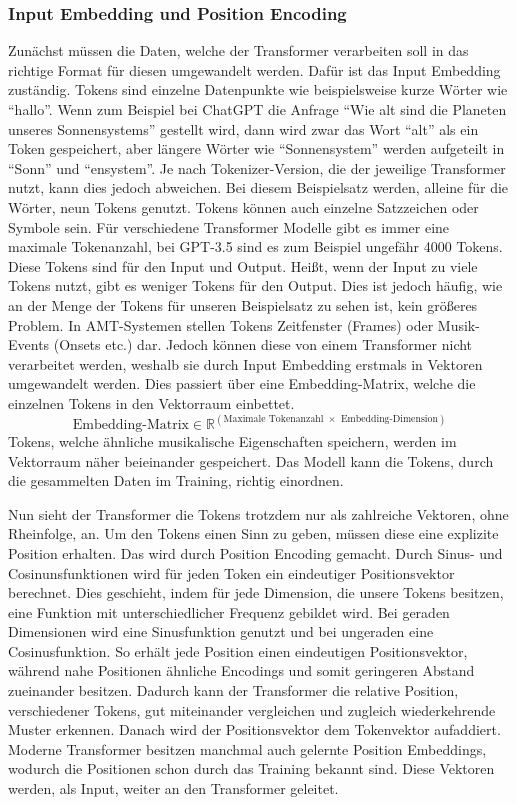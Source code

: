 \subsubsection{Input Embedding und Position Encoding}
Zunächst müssen die Daten, welche der Transformer verarbeiten soll in das richtige Format für diesen umgewandelt werden.
Dafür ist das Input Embedding zuständig.
Tokens sind einzelne Datenpunkte wie beispielsweise kurze Wörter wie \enquote{hallo}.
Wenn zum Beispiel bei ChatGPT die Anfrage \enquote{Wie alt sind die Planeten unseres Sonnensystems} gestellt wird,
dann wird zwar das Wort \enquote{alt} als ein Token gespeichert, aber längere Wörter wie \enquote{Sonnensystem}
werden aufgeteilt in \enquote{Sonn} und \enquote{ensystem}.
Je nach Tokenizer-Version, die der jeweilige Transformer nutzt, kann dies jedoch abweichen.
Bei diesem Beispielsatz werden, alleine für die Wörter, neun Tokens genutzt.
Tokens können auch einzelne Satzzeichen oder Symbole sein.
Für verschiedene Transformer Modelle gibt es immer eine maximale Tokenanzahl,
bei GPT-3.5 sind es zum Beispiel ungefähr 4000 Tokens.
Diese Tokens sind für den Input und Output.
Heißt, wenn der Input zu viele Tokens nutzt, gibt es weniger Tokens für den Output.
Dies ist jedoch häufig, wie an der Menge der Tokens für unseren Beispielsatz zu sehen ist, kein größeres Problem.
In AMT-Systemen stellen Tokens Zeitfenster (Frames) oder Musik-Events (Onsets etc.) dar.
Jedoch können diese von einem Transformer nicht verarbeitet werden,
weshalb sie durch Input Embedding erstmals in Vektoren umgewandelt werden.
Dies passiert über eine Embedding-Matrix, welche die einzelnen Tokens in den Vektorraum einbettet.
\[
\displaystyle
\text{Embedding-Matrix} \in \mathbb{R}^{\left( \text{Maximale Tokenanzahl } \times \text{ Embedding-Dimension} \right)}
\]
Tokens, welche ähnliche musikalische Eigenschaften speichern, werden im Vektorraum näher beieinander gespeichert.
Das Modell kann die Tokens, durch die gesammelten Daten im Training, richtig einordnen.

Nun sieht der Transformer die Tokens trotzdem nur als zahlreiche Vektoren, ohne Rheinfolge, an.
Um den Tokens einen Sinn zu geben, müssen diese eine explizite Position erhalten.
Das wird durch Position Encoding gemacht.
Durch Sinus- und Cosinunsfunktionen wird für jeden Token ein eindeutiger Positionsvektor berechnet.
Dies geschieht, indem für jede Dimension, die unsere Tokens besitzen, eine Funktion mit unterschiedlicher Frequenz gebildet wird.
Bei geraden Dimensionen wird eine Sinusfunktion genutzt und bei ungeraden eine Cosinusfunktion.
So erhält jede Position einen eindeutigen Positionsvektor,
während nahe Positionen ähnliche Encodings und somit geringeren Abstand zueinander besitzen.
Dadurch kann der Transformer die relative Position, verschiedener Tokens,
gut miteinander vergleichen und zugleich wiederkehrende Muster erkennen.
Danach wird der Positionsvektor dem Tokenvektor aufaddiert.
Moderne Transformer besitzen manchmal auch gelernte Position Embeddings,
wodurch die Positionen schon durch das Training bekannt sind.
Diese Vektoren werden, als Input, weiter an den Transformer geleitet.

